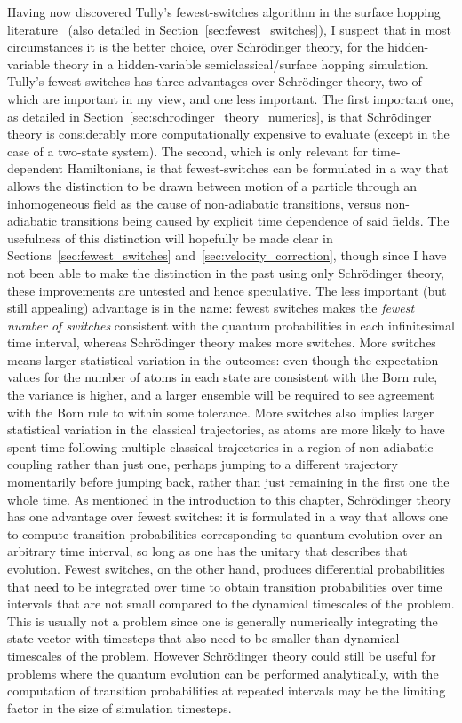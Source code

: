 Having now discovered Tully's fewest-switches algorithm in the surface hopping literature~\cite{doi:10.1063/1.459170, doi:10.1146/annurev-physchem-040215-112245, doi:10.1063/1.2715585} (also detailed in Section~\ref{sec:fewest_switches}), I suspect that in most circumstances it is the better choice, over Schr\"odinger theory, for the hidden-variable theory in a hidden-variable semiclassical/surface hopping simulation. Tully's fewest switches has three advantages over Schr\"odinger theory, two of which are important in my view, and one less important. The first important one, as detailed in Section~\ref{sec:schrodinger_theory_numerics}, is that Schr\"odinger theory is considerably more computationally expensive to evaluate (except in the case of a two-state system). The second, which is only relevant for time-dependent Hamiltonians, is that fewest-switches can be formulated in a way that allows the distinction to be drawn between motion of a particle through an inhomogeneous field as the cause of non-adiabatic transitions, versus non-adiabatic transitions being caused by explicit time dependence of said fields. The usefulness of this distinction will hopefully be made clear in Sections~\ref{sec:fewest_switches} and~\ref{sec:velocity_correction}, though since I have not been able to make the distinction in the past using only Schr\"odinger theory, these improvements are untested and hence speculative. The less important (but still appealing) advantage is in the name: fewest switches makes the \emph{fewest number of switches} consistent with the quantum probabilities in each infinitesimal time interval, whereas Schr\"odinger theory makes more switches. More switches means larger statistical variation in the outcomes: even though the expectation values for the number of atoms in each state are consistent with the Born rule, the variance is higher, and a larger ensemble will be required to see agreement with the Born rule to within some tolerance. More switches also implies larger statistical variation in the classical trajectories, as atoms are more likely to have spent time following multiple classical trajectories in a region of non-adiabatic coupling rather than just one, perhaps jumping to a different trajectory momentarily before jumping back, rather than just remaining in the first one the whole time. As mentioned in the introduction to this chapter, Schr\"odinger theory has one advantage over fewest switches: it is formulated in a way that allows one to compute transition probabilities corresponding to quantum evolution over an arbitrary time interval, so long as one has the unitary that describes that evolution. Fewest switches, on the other hand, produces differential probabilities that need to be integrated over time to obtain transition probabilities over time intervals that are not small compared to the dynamical timescales of the problem. This is usually not a problem since one is generally numerically integrating the state vector with timesteps that also need to be smaller than dynamical timescales of the problem. However Schr\"odinger theory could still be useful for problems where the quantum evolution can be performed analytically, with the computation of transition probabilities at repeated intervals may be the limiting factor in the size of simulation timesteps.

